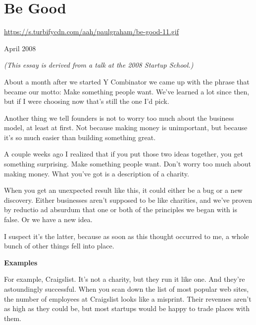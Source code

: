 \chapter{Be Good}


            
              
                \href{https://s.turbifycdn.com/aah/paulgraham/be-good-11.gif}{https://s.turbifycdn.com/aah/paulgraham/be-good-11.gif}



April 2008

\emph{(This essay is derived from a talk at the 2008 Startup
                    School.)}

About a month after we started Y Combinator we
                  came up with the phrase that became our motto: Make something
                  people want. We've learned a lot since then, but if I were
                  choosing now that's still the one I'd pick.

Another
                  thing we tell founders is not to worry too much about the
                  business model, at least at first. Not because making money is
                  unimportant, but because it's so much easier than building
                  something great.

A couple weeks ago I realized that
                  if you put those two ideas together, you get something
                  surprising. Make something people want. Don't worry too much
                  about making money. What you've got is a description of a
                  charity.

When you get an unexpected result like
                  this, it could either be a bug or a new discovery. Either
                  businesses aren't supposed to be like charities, and we've
                  proven by reductio ad absurdum that one or both of the
                  principles we began with is false. Or we have a new idea.

I
                  suspect it's the latter, because as soon as this thought
                  occurred to me, a whole bunch of other things fell into
                  place.

\textbf{Examples}

For example,
                  Craigslist. It's not a charity, but they run it like one. And
                  they're astoundingly successful. When you scan down the list
                  of most popular web sites, the number of employees at
                  Craigslist looks like a misprint. Their revenues aren't as
                  high as they could be, but most startups would be happy to
                  trade places with them.

